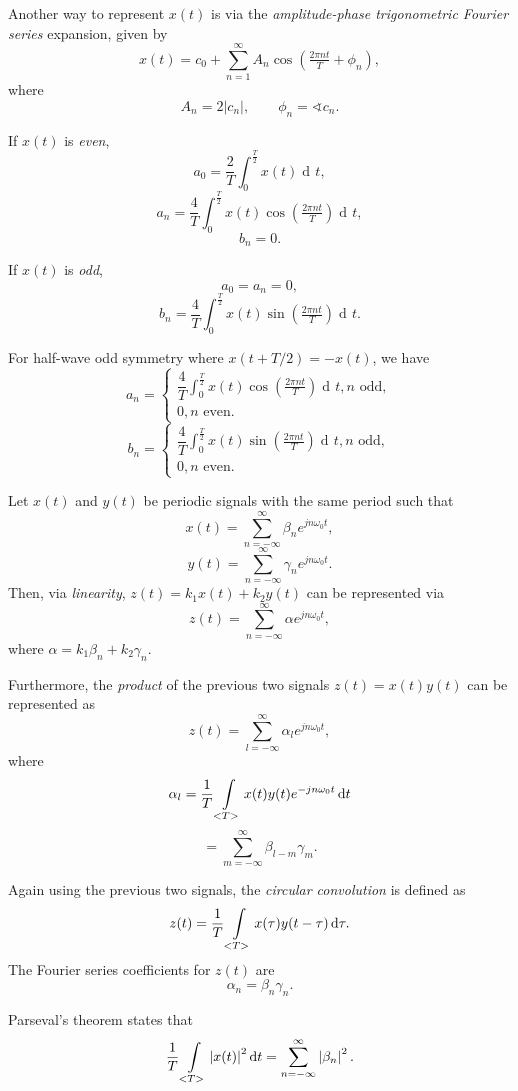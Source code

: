 \documentclass[10pt,letterpaper]{article}
\DeclareMathOperator{\di}{d\!} %
\newcommand{\sumi}[1][1]{ \sum_{n={#1}}^{\infty} } %
\newcommand{\bracks}[1]{ \left( #1 \right) } %
\newcommand{\tpfrac}[2]{\left(\tfrac{#1}{#2}\right)} %
\newcommand{\abs}[1]{\left| #1 \right|} %
\newcommand{\xabs}{ \abs{x(t)}^2 }
\newcommand{\Uint}{ \int\displaylimits_{<T>} }
\newcommand{\fatcos}{ \cos\tpfrac{2\pi nt}{T} }
\newcommand{\fatsin}{ \sin\tpfrac{2\pi nt}{T} }
\newcommand{\Hint}{ \int_0^{\frac{T}{2}} }
\newcommand{\omegaE}{ e^{jn\omega_0t} }
\newcommand{\omegaEneg}{ e^{-jn\omega_0t} }
\begin{document}
\begin{multicols*}{3}
Another way to represent $x(t)$ is via the \textit{amplitude-phase trigonometric Fourier series} expansion, given by
\[ x(t) = c_0 + \sumi A_n \cos\bracks{\tfrac{2\pi nt}{T} + \phi_n}, \]
where
\[ A_n = 2|c_n|, \qquad \phi_n = \sphericalangle c_n. \]

If $x(t)$ is \textit{even},
\[ a_0 = \dfrac{2}{T} \Hint x(t) \di t, \]
\[ a_n = \dfrac{4}{T} \Hint x(t) \fatcos \di t, \]
\[ b_n = 0. \]

If $x(t)$ is \textit{odd},
\[ a_0 = a_n = 0, \]
\[ b_n = \dfrac{4}{T} \Hint x(t) \fatsin \di t. \]

For half-wave odd symmetry where $x(t + T/2) = -x(t)$, we have
\[ a_n = \begin{cases}
		\dfrac{4}{T} \displaystyle\Hint x(t) \fatcos \di t, n \text{ odd}, \\
		0, n \text{ even}.
		\end{cases} 
\]
\[ b_n = \begin{cases}
		\dfrac{4}{T} \displaystyle\Hint x(t) \fatsin \di t, n \text{ odd}, \\
		0, n \text{ even}.
		\end{cases} 
\]

Let $x(t)$ and $y(t)$ be periodic signals with the same period such that
\[ x(t) = \sumi[-\infty] \beta_n \omegaE, \]
\[ y(t) = \sumi[-\infty] \gamma_n \omegaE. \]
Then, via \textit{linearity}, $z(t) = k_1x(t) + k_2y(t)$ can be represented via
\[ z(t) = \sumi[-\infty] \alpha \omegaE, \]
where $\alpha = k_1\beta_n + k_2\gamma_n$. 

Furthermore, the \textit{product} of the previous two signals $z(t) = x(t)y(t)$ can be represented as
\[ z(t) = \sum_{l = -\infty}^{\infty} \alpha_l \omegaE, \]
where
\[ \alpha_l = \dfrac{1}{T} \Uint x(t)y(t) \omegaEneg \di t \]
\[ = \sum^{\infty}_{m = -\infty}\beta_{l-m}\gamma_m. \]

Again using the previous two signals, the \textit{circular convolution} is defined as
\[ z(t) = \dfrac{1}{T} \Uint x(\tau) y(t-\tau) \di \tau. \]
The Fourier series coefficients for $z(t)$ are
\[ \alpha_n = \beta_n\gamma_n. \]


Parseval's theorem states that
\[ \dfrac{1}{T} \Uint \xabs \di t = \sumi[-\infty] \abs{\beta_n}^2. \]


\end{multicols*}
\end{document}
